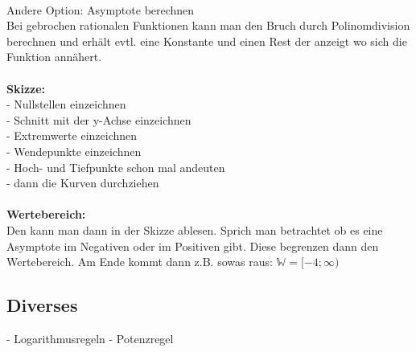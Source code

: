 \documentclass[6pt,a4paper]{scrartcl}
\begin{document}
\begin{multicols*}{2}
\\
Andere Option: Asymptote berechnen\\
Bei gebrochen rationalen Funktionen kann man den Bruch durch Polinomdivision berechnen und erhält evtl. eine Konstante und einen Rest der anzeigt wo sich die Funktion annähert.\\
\\
\textbf{Skizze:}\\
- Nullstellen einzeichnen\\
- Schnitt mit der y-Achse einzeichnen\\
- Extremwerte einzeichnen\\
- Wendepunkte einzeichnen\\
- Hoch- und Tiefpunkte schon mal andeuten\\
- dann die Kurven durchziehen\\
\\
\textbf{Wertebereich:}\\
Den kann man dann in der Skizze ablesen. Sprich man betrachtet ob es eine Asymptote im Negativen oder im Positiven gibt. Diese begrenzen dann den Wertebereich. Am Ende kommt dann z.B. sowas raus: $\mathbb{W} = [-4; \infty)$
\subsection{Diverses}
- Logarithmusregeln
- Potenzregel

\end{multicols*}


\end{document}
